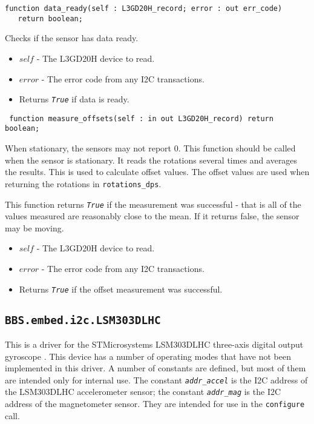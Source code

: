 \documentclass[10pt, openany]{book}
\newcommand{\indexfunc}[1]{\index[func]{#1}}
\newcommand{\package}[1]{\texttt{#1}}
\newcommand{\function}[1]{\texttt{#1}}
\newcommand{\constant}[1]{\emph{\texttt{#1}}}
\newcommand{\datatype}[1]{\texttt{#1}}
\begin{document}
\begin{lstlisting}
function data_ready(self : L3GD20H_record; error : out err_code)
   return boolean;
\end{lstlisting}
\indexfunc{data\_ready}
Checks if the sensor has data ready.
\begin{itemize}
  \item $self$ - The L3GD20H device to read.
  \item $error$ - The error code from any I2C transactions.
  \item Returns \constant{True} if data is ready.
\end{itemize}

\begin{lstlisting}
 function measure_offsets(self : in out L3GD20H_record) return boolean;
\end{lstlisting}
\indexfunc{measure\_offsets}
When stationary, the sensors may not report 0.  This function should be called when the sensor is stationary.  It reads the rotations several times and averages the results.  This is used to calculate offset values.  The offset values are used when returning the rotations in \datatype{rotations\_dps}.

This function returns \constant{True} if the measurement was successful - that is all of the values measured are reasonably close to the mean.  If it returns false, the sensor may be moving.
\begin{itemize}
  \item $self$ - The L3GD20H device to read.
  \item $error$ - The error code from any I2C transactions.
  \item Returns \constant{True} if the offset measurement was successful.
\end{itemize}

\subsection{\package{BBS.embed.i2c.LSM303DLHC}}
This is a driver for the STMicrosystems LSM303DLHC three-axis digital output gyroscope \cite{LSM303DLHC}.  This device has a number of operating modes that have not been implemented in this driver.  A number of constants are defined, but most of them are intended only for internal use.  The constant \constant{addr\_accel} is the I2C address of the LSM303DLHC accelerometer sensor; the constant \constant{addr\_mag} is the I2C address of the magnetometer sensor.  They are intended for use in the \function{configure} call.
\end{document}
